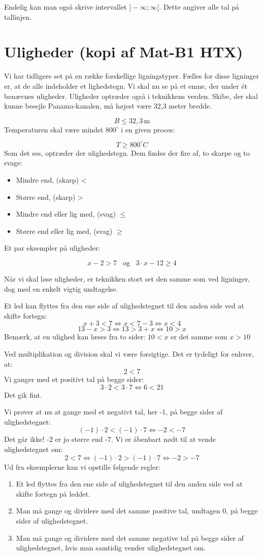 \documentclass[12pt,oneside,a4paper]{article}
\begin{document}
Endelig kan man også skrive intervallet $]-\infty ;\infty [$. Dette angiver
alle tal på tallinjen.

\section{Uligheder (kopi af Mat-B1 HTX)}
Vi har tidligere set på en række forskellige ligningstyper. Fælles for disse
ligninger er, at de alle indeholder et lighedstegn. Vi skal nu se på et emne,
der under ét benævnes uligheder. Uligheder optræder også i teknikkens verden.
Skibe, der skal kunne besejle Panama-kanalen, må højest være 32,3 meter bredde.

$$
B\leq 32,3 \, \text{m}
$$
Temperaturen skal være mindst $800^\circ$ i en given proces:


$$
T \geq 800 ^\circ C
$$
Som det ses, optræder der ulighedstegn. Dem findes der fire af, to skarpe og to svage:

\begin{itemize}
    \item Mindre end, (skarp) <
    \item Større end, (skarp) >
    \item Mindre end eller lig med, (svag) $\leq$
    \item Større end eller lig med, (svag) $\geq$
\end{itemize}

Et par eksempler på uligheder:

$$
x-2>7 \;\;\; \text{og} \;\;\; 3\cdot x-12\geq 4
$$

Når vi skal løse uligheder, er teknikken stort set den samme som ved ligninger, dog med en enkelt vigtig undtagelse.

Et led kan flyttes fra den ene side af ulighedstegnet til den anden side ved at skifte fortegn:
$$
x+3<7 \Leftrightarrow x<7-3 \Leftrightarrow x<4
$$
$$
13-x>3 \Leftrightarrow 13>3+x \Leftrightarrow 10>x
$$
Bemærk, at en ulighed kan læses fra to sider:
$10 < x$ er det samme som $x > 10$

Ved multiplikation og division skal vi være forsigtige. Det er tydeligt for enhver, at:
$$
2<7
$$
Vi ganger med et positivt tal på begge sider:
$$
3 \cdot 2 <3 \cdot 7 \Leftrightarrow 6<21
$$
Det gik fint.

Vi prøver at nu at gange med et negativt tal, her -1, på begge sider af ulighedstegnet:
$$
(-1) \cdot 2 < (-1) \cdot 7 \Leftrightarrow -2<-7
$$
Det går ikke! -2 er jo større end -7. Vi er åbenbart nødt til at vende ulighedstegnet om:
$$
2<7 \Leftrightarrow (-1) \cdot 2 > (-1) \cdot 7 \Leftrightarrow -2>-7
$$
Ud fra eksemplerne kan vi opstille følgende regler:
\begin{enumerate}
    \item Et led flyttes fra den ene side af ulighedstegnet til den anden side ved at skifte fortegn på leddet.
    \item Man må gange og dividere med det samme positive tal, undtagen 0, på begge sider af ulighedstegnet.
    \item Man må gange og dividere med det samme negative tal på begge sider af ulighedstegnet, hvis man samtidig vender ulighedstegnet om.
\end{enumerate}
\end{document}
